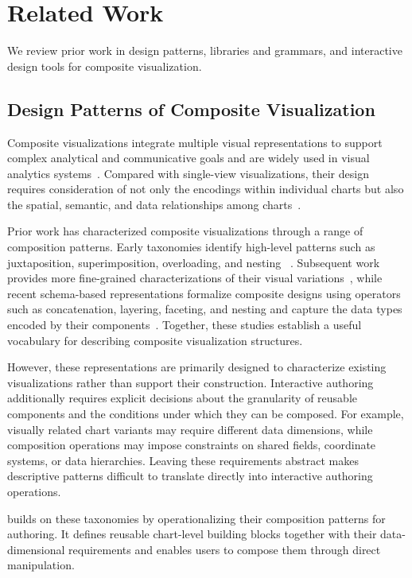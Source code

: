 \section{Related Work}
We review prior work in design patterns, libraries and grammars, and interactive design tools for composite visualization.
\subsection{Design Patterns of Composite Visualization}

Composite visualizations integrate multiple visual representations to support
complex analytical and communicative goals and are widely used in visual
analytics systems~\cite{vasurvey, Survey16, deng2023survey, AI4VIS}. Compared
with single-view visualizations, their design requires consideration of not
only the encodings within individual charts but also the spatial, semantic,
and data relationships among charts~\cite{nested, lyi2020comparative,
Composite, vaid}.

Prior work has characterized composite visualizations through a range of
composition patterns. Early taxonomies identify high-level patterns such as
juxtaposition, superimposition, overloading, and nesting
~\cite{javed2012exploring}. Subsequent work provides more fine-grained
characterizations of their visual variations~\cite{Composite}, while recent
schema-based representations formalize composite designs using operators such
as concatenation, layering, faceting, and nesting and capture the data types
encoded by their components~\cite{vaid}. Together, these studies establish a
useful vocabulary for describing composite visualization structures.

However, these representations are primarily designed to characterize
existing visualizations rather than support their construction. Interactive
authoring additionally requires explicit decisions about the granularity of
reusable components and the conditions under which they can be composed. For
example, visually related chart variants may require different data
dimensions, while composition operations may impose constraints on shared
fields, coordinate systems, or data hierarchies. Leaving these requirements
abstract makes descriptive patterns difficult to translate directly into
interactive authoring operations.

{\system} builds on these taxonomies by operationalizing their composition
patterns for authoring. It defines reusable chart-level building blocks
together with their data-dimensional requirements and enables users to compose
them through direct manipulation.


